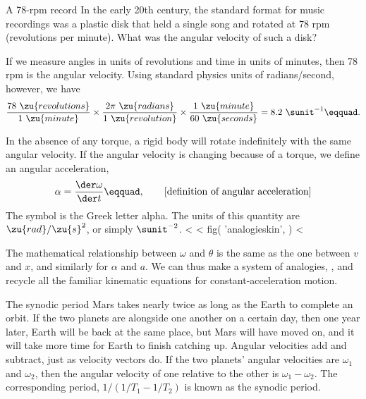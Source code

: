 \begin{eg}{A 78-rpm record}
\egquestion
In the early 20th century, the standard format for
music recordings was a plastic disk that held a single song
and rotated at 78 rpm (revolutions per minute). What was the
angular velocity of such a disk?

\eganswer
If we measure angles in units of revolutions and
time in units of minutes, then 78 rpm is the angular
velocity. Using standard physics units of radians/second,
however, we have
\begin{equation*}
                \frac{78\ \zu{revolutions}}{1\ \zu{minute}}
                \times\frac{2\pi\ \zu{radians}}{1\ \zu{revolution}}
                \times\frac{1\ \zu{minute}}{60\ \zu{seconds}}
                         =  8.2\ \sunit^{-1}\eqquad.
\end{equation*}
\end{eg}

In the absence of any torque, a rigid body will rotate
indefinitely with the same angular velocity. If the angular
velocity is changing because of a torque, we define an
angular acceleration,
\begin{equation*}
        \alpha        =          \frac{\der\omega}{\der t}\eqquad, \qquad        
        \text{[definition of
        angular acceleration]}
\end{equation*}
The symbol is the Greek letter alpha. The units of this
quantity are $\zu{rad}/\zu{s}^2$, or simply $\sunit^{-2}$.
<%
<%
  fig(
    'analogieskin',
  )
<%

The mathematical relationship between $\omega$ and $\theta$ is the same as
the one between $v$ and $x$, and similarly for $\alpha$ and $a$. We can
thus make a system of analogies, , and recycle all
the familiar kinematic equations for constant-acceleration
motion.

\begin{eg}{The synodic period}
Mars takes nearly twice as long as the Earth to complete an orbit.
If the two planets are alongside one another on a certain day, then one year
later, Earth will be back at the same place, but Mars will have moved
on, and it will take more time for Earth to finish catching up. Angular
velocities add and subtract, just as velocity
vectors do. If the two planets' angular velocities are $\omega_1$
and $\omega_2$, then the angular velocity of one relative to the other
is $\omega_1-\omega_2$. The corresponding period, $1/(1/T_1-1/T_2)$ is
known as the synodic period.
\end{eg}

